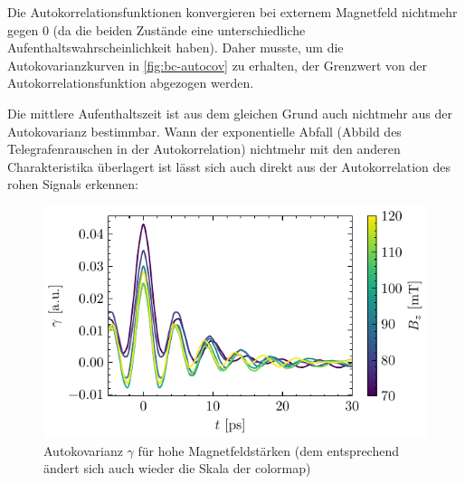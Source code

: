 \documentclass[main.tex]{subfiles}
\begin{document}

Die Autokorrelationsfunktionen konvergieren bei externem Magnetfeld nichtmehr gegen \num{0} (da die beiden Zustände eine unterschiedliche Aufenthaltswahrscheinlichkeit haben). Daher musste, um die Autokovarianzkurven in \cref{fig:bc-autocov} zu erhalten, der Grenzwert von der Autokorrelationsfunktion abgezogen werden.

Die mittlere Aufenthaltszeit ist aus dem gleichen Grund auch nichtmehr aus der Autokovarianz bestimmbar. Wann der exponentielle Abfall (Abbild  des Telegrafenrauschen in der Autokorrelation) nichtmehr mit den anderen Charakteristika  überlagert ist lässt sich auch direkt aus der Autokorrelation des rohen Signals erkennen:

\begin{figure}[H]
    \centering
    \includegraphics{bilder/plots/max_Bz/autocov_high.pdf}
    \caption{Autokovarianz $\gamma$ für hohe Magnetfeldstärken (dem entsprechend ändert sich auch wieder die Skala der colormap)}\label{fig:bc-autocov-high}
\end{figure}
\end{document}
